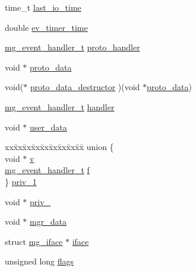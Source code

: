\begin{DoxyCompactItemize}
\item 
time\+\_\+t \hyperlink{structmg__connection_aaf0f39b26deef84e6c204a176ea1e50a_aaf0f39b26deef84e6c204a176ea1e50a}{last\+\_\+io\+\_\+time}
\item 
double \hyperlink{structmg__connection_a84d1a7e42f1326c70f61f71e65082dc0_a84d1a7e42f1326c70f61f71e65082dc0}{ev\+\_\+timer\+\_\+time}
\item 
\hyperlink{mongoose_8h_ae5a76da37b3496fcdf561e51648eabda_ae5a76da37b3496fcdf561e51648eabda}{mg\+\_\+event\+\_\+handler\+\_\+t} \hyperlink{structmg__connection_ae6b1f0d002253c0f80371fc5a7bbfc70_ae6b1f0d002253c0f80371fc5a7bbfc70}{proto\+\_\+handler}
\item 
void $\ast$ \hyperlink{structmg__connection_a7508851a3c070a1357c226781fa92bb7_a7508851a3c070a1357c226781fa92bb7}{proto\+\_\+data}
\item 
void($\ast$ \hyperlink{structmg__connection_a834e7757b28379b2ca0b8b6c51d7ba95_a834e7757b28379b2ca0b8b6c51d7ba95}{proto\+\_\+data\+\_\+destructor} )(void $\ast$\hyperlink{structmg__connection_a7508851a3c070a1357c226781fa92bb7_a7508851a3c070a1357c226781fa92bb7}{proto\+\_\+data})
\item 
\hyperlink{mongoose_8h_ae5a76da37b3496fcdf561e51648eabda_ae5a76da37b3496fcdf561e51648eabda}{mg\+\_\+event\+\_\+handler\+\_\+t} \hyperlink{structmg__connection_a1f14bd154357c301cce137c9ac1d1edb_a1f14bd154357c301cce137c9ac1d1edb}{handler}
\item 
void $\ast$ \hyperlink{structmg__connection_ab6d66a4eacc5d4d15f817ce98f26322d_ab6d66a4eacc5d4d15f817ce98f26322d}{user\+\_\+data}
\item 
\begin{tabbing}
xx\=xx\=xx\=xx\=xx\=xx\=xx\=xx\=xx\=\kill
union \{\\
\>void $\ast$ \hyperlink{structmg__connection_a1c70d397e2abcd97dfdee3311357f9cd_a1c70d397e2abcd97dfdee3311357f9cd}{v}\\
\>\hyperlink{mongoose_8h_ae5a76da37b3496fcdf561e51648eabda_ae5a76da37b3496fcdf561e51648eabda}{mg\_event\_handler\_t} \hyperlink{structmg__connection_a9bff1f6466b9a610dad5591bdbe79daa_a9bff1f6466b9a610dad5591bdbe79daa}{f}\\
\} \hyperlink{structmg__connection_ad4386d39d9feedc547a1b1fcc8c5c7de_ad4386d39d9feedc547a1b1fcc8c5c7de}{priv\_1}\\

\end{tabbing}\item 
void $\ast$ \hyperlink{structmg__connection_aeb5efea496ac74ed2e0b8864f4fd6f65_aeb5efea496ac74ed2e0b8864f4fd6f65}{priv\+\_}
\item 
void $\ast$ \hyperlink{structmg__connection_a19cb5ee4c2402582dcf4cb6a4f899136_a19cb5ee4c2402582dcf4cb6a4f899136}{mgr\+\_\+data}
\item 
struct \hyperlink{structmg__iface}{mg\+\_\+iface} $\ast$ \hyperlink{structmg__connection_a6f337461553de516901473bd8bb11a0a_a6f337461553de516901473bd8bb11a0a}{iface}
\item 
unsigned long \hyperlink{structmg__connection_aa47edda11152dd7769a76d806a87e1aa_aa47edda11152dd7769a76d806a87e1aa}{flags}
\end{DoxyCompactItemize}


